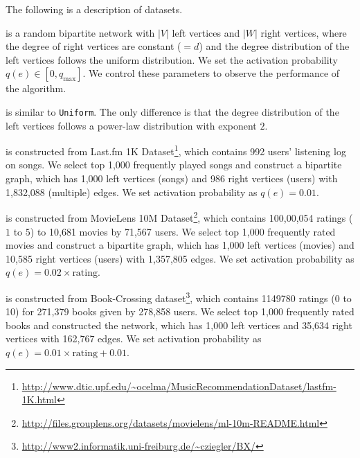 \documentclass[letterpaper]{article}
\theoremstyle{definition}
\begin{document}
The following is a description of datasets.

\begin{description}[font=\tt,leftmargin=10pt]
  \setlength{\parskip}{0pt}
  \setlength{\itemsep}{0pt}
  \item[Uniform] is a random bipartite network with $|V|$ left vertices and $|W|$ right vertices, where the degree of right vertices are constant ($= d$) and the degree distribution of the left vertices follows the uniform distribution. We set the activation probability $q(e) \in [0, q_{\text{max}}]$. We control these parameters to observe the performance of the algorithm.

  \item[PowerLaw] is similar to \texttt{Uniform}. The only difference is that the degree distribution of the left vertices follows a power-law distribution with exponent $2$.
\end{description}
\begin{description}[font=\tt,leftmargin=10pt]
  \item[Last.fm] is constructed from Last.fm 1K Dataset\footnote{\url{http://www.dtic.upf.edu/~ocelma/MusicRecommendationDataset/lastfm-1K.html}}, which contains 992 users' listening log on songs.
    We select top 1,000 frequently played songs and construct a bipartite graph, which has 1,000 left vertices (songs) and 986 right vertices (users) with 1,832,088 (multiple) edges.
    We set activation probability as $q(e) = 0.01$.

  \item[MovieLens] is constructed from MovieLens 10M Dataset\footnote{\url{http://files.grouplens.org/datasets/movielens/ml-10m-README.html}}, which contains 100,00,054 ratings ($1$ to $5$) to 10,681 movies by 71,567 users.
    We select top 1,000 frequently rated movies and construct a bipartite graph, which has 1,000 left vertices (movies) and 10,585 right vertices (users) with 1,357,805 edges.
    We set activation probability as $q(e) = 0.02 \times \text{rating}$.

  \item[BookCrossing] is constructed from Book-Crossing dataset\footnote{\url{http://www2.informatik.uni-freiburg.de/~cziegler/BX/}}, which contains 
    1149780 ratings (0 to 10) for 271,379 books given by 278,858 users.
    We select top 1,000 frequently rated books and constructed the network, which has 1,000 left vertices and 35,634 right vertices with 162,767 edges.
    We set activation probability as $q(e) = 0.01 \times \text{rating} + 0.01$.
\end{description}
\end{document}
